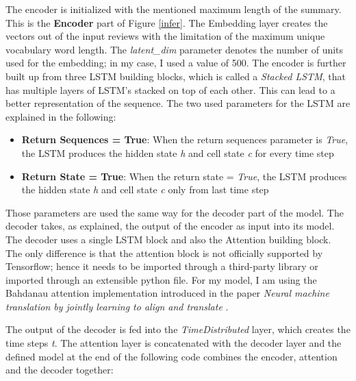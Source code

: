 The encoder is initialized with the mentioned maximum length of the summary. This is the \textbf{Encoder} part of Figure \ref{infer}. The Embedding layer creates the vectors out of the input reviews with the limitation of the maximum unique vocabulary word length. The \textit{latent\_dim} parameter denotes the number of units used for the embedding; in my case, I used a value of 500. The encoder is further built up from three LSTM building blocks, which is called a \textit{Stacked LSTM}, that has multiple layers of LSTM's stacked on top of each other. This can lead to a better representation of the sequence. The two used parameters for the LSTM are explained in the following:

\begin{itemize}
	\item \textbf{Return Sequences = True}: When the return sequences parameter is \textit{True}, the LSTM produces the hidden state \textit{h} and cell state \textit{c} for every time step
	\item \textbf{Return State = True}: When the return state = \textit{True}, the LSTM produces the hidden state \textit{h} and cell state \textit{c} only from last time step 
\end{itemize}


Those parameters are used the same way for the decoder part of the model. The decoder takes, as explained, the output of the encoder as input into its model. The decoder uses a single LSTM block and also the Attention building block. The only difference is that the attention block is not officially supported by Tensorflow; hence it needs to be imported through a third-party library or imported through an extensible python file. For my model, I am using the Bahdanau attention implementation introduced in the paper \textit{Neural machine translation by jointly learning to align and translate} \cite{bah}.

The output of the decoder is fed into the \textit{TimeDistributed} layer, which creates the time steps \textit{t}. The attention layer is concatenated with the decoder layer and the defined model at the end of the following code combines the encoder, attention and the decoder together: \\ \\ \\

